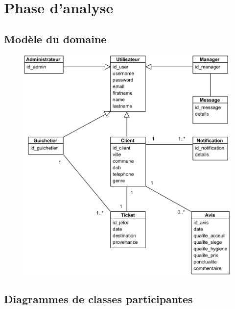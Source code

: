 \section[Phase d’analyse]{Phase d’analyse}
    \subsection[Modèle du domaine]{Modèle du domaine}
        \begin{figure}[H]
            \centering
            \includegraphics[width=130mm]{images/md-systeme.png}
            \label{fig:mdSysteme}
        \end{figure}
    \subsection[Diagrammes de classes participantes]{Diagrammes de classes participantes}
